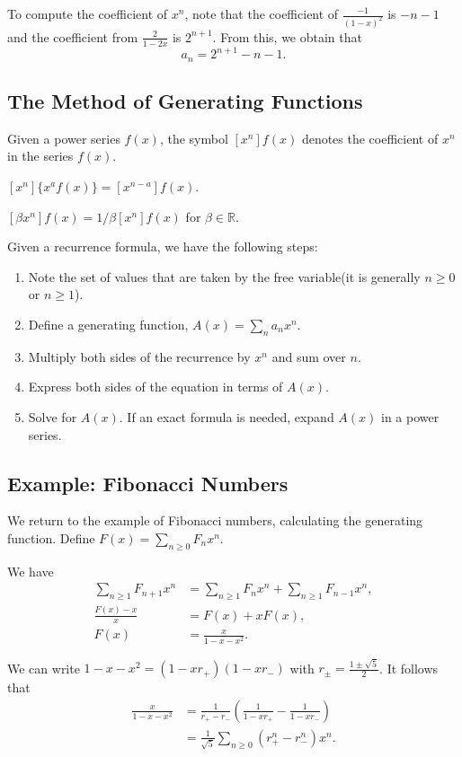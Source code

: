 \documentclass[11pt]{article}
\newcommand{\R}{\mathbb{R}}
\renewcommand{\>}{\rangle}
\newcommand{\<}{\langle}
\begin{document}
To compute the coefficient of $x^n$, note that the coefficient of $\frac{-1}{(1-x)^2}$ is $-n-1$ and the coefficient from $\frac{2}{1-2x}$ is $2^{n+1}$.  From this, we obtain that 
$$a_n = 2^{n+1} - n - 1.$$
\subsection{The Method of Generating Functions}
\begin{definition} Given a power series $f(x)$, the symbol $[x^n]f(x)$ denotes the coefficient of $x^n$ in the series $f(x)$.
\end{definition}
\begin{fact} $[x^n]\{x^a f(x)\} = [x^{n-a}]f(x)$.
\end{fact}
\begin{fact} $[\beta x^n]f(x) = 1/\beta [x^n]f(x)$ for $\beta \in \R$.
\end{fact}
Given a recurrence formula, we have the following steps:
\begin{enumerate}
\item Note the set of values that are taken by the free variable(it is generally $n \ge 0$ or $n \ge 1$).
\item Define a generating function, $A(x) = \sum_{n} a_n x^n$.
\item Multiply both sides of the recurrence by $x^n$ and sum over $n$.
\item Express both sides of the equation in terms of $A(x)$.
\item Solve for $A(x)$.  If an exact formula is needed, expand $A(x)$ in a power series.  
\end{enumerate}

\subsection{Example: Fibonacci Numbers}
We return to the example of Fibonacci numbers, calculating the generating function.  Define $F(x) = \sum_{n \ge 0} F_n x^n$.  

We have 
\begin{align*}
\sum_{n \ge 1} F_{n+1} x^n &= \sum_{n \ge 1} F_n x^n + \sum_{n \ge 1} F_{n-1} x^n, \\
\frac{F(x) - x}{x} &= F(x) + xF(x), \\
F(x) &= \frac{x}{1 - x - x^2}.
\end{align*}

We can write $1 - x - x^2 = (1-xr_+)(1 - xr_-)$ with $r_{\pm} = \frac{1\pm \sqrt{5}}{2}$.  It follows that 
\begin{align*}
\frac{x}{1-x-x^2} &= \frac{1}{r_+ - r_-} \left( \frac{1}{1-xr_+} - \frac{1}{1 - xr_-}\right) \\
&= \frac{1}{\sqrt{5}} \sum_{n \ge 0} (r_+^n - r_-^n)x^n.
\end{align*}
\end{document}

